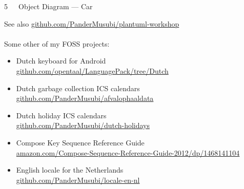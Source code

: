 \documentclass{beamer}
\begin{document}
\begin{frame}{5~~~Object Diagram — Car}
\begin{figure}
\def\centering\svgwidth{\textwidth}
\resizebox{\textwidth}{!}{}
\end{figure} 
\end{frame}



\begin{frame}{See also}
\href{https://github.com/PanderMusubi/plantuml-workshop}{github.com/PanderMusubi/plantuml-workshop}
\\\mbox{}\\
Some other of my FOSS projects:
\begin{itemize}
\item Dutch keyboard for Android\\\href{https://github.com/opentaal/LanguagePack/tree/Dutch}{github.com/opentaal/LanguagePack/tree/Dutch}
\item Dutch garbage collection ICS calendars\\\href{https://github.com/PanderMusubi/afvalophaaldata}{github.com/PanderMusubi/afvalophaaldata}
\item Dutch holiday ICS calendars\\\href{https://github.com/PanderMusubi/dutch-holidays}{github.com/PanderMusubi/dutch-holidays}
\item Compose Key Sequence Reference Guide\\\href{https://amazon.com/Compose-Sequence-Reference-Guide-2012/dp/1468141104}{amazon.com/Compose-Sequence-Reference-Guide-2012/dp/1468141104}
\item English locale for the Netherlands\\\href{https://github.com/PanderMusubi/locale-en-nl}{github.com/PanderMusubi/locale-en-nl}
\end{itemize}
\end{frame}
\end{document}
